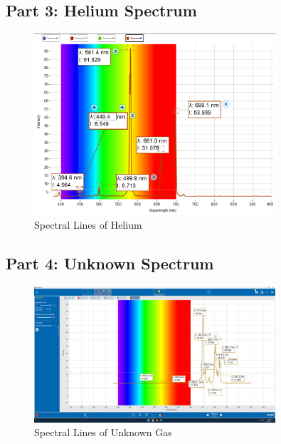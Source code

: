 \subsection{Part 3: Helium Spectrum}
\begin{figure}
    \centering
    \includegraphics[width=0.8\textwidth]{Results/photospectrometry/helium.png}
    \caption{Spectral Lines of Helium}
    \label{fig:helium_spectrum}
\end{figure}

\subsection{Part 4: Unknown Spectrum}
\begin{figure}
    \centering
    \includegraphics[width=0.8\textwidth]{Results/photospectrometry/unknown.png}
    \caption{Spectral Lines of Unknown Gas}
    \label{fig:unknown_spectrum}
\end{figure}


